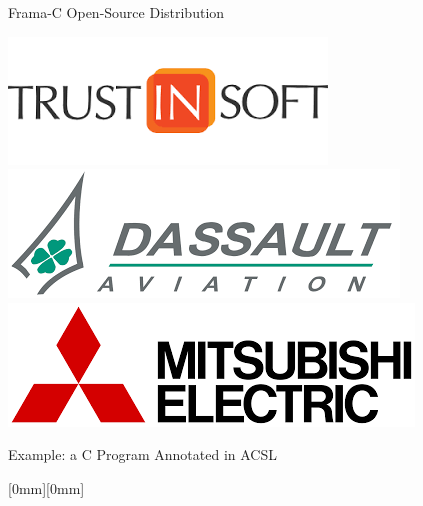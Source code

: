 \begin{frame}[fragile]{Frama-C Open-Source Distribution}
\begin{center}
    \hfill
    \includegraphics[scale=0.12]{logos/trustinsoft.png}
    \hfill
    \includegraphics[scale=0.12]{logos/dassault.png}
    \hfill
    \includegraphics[scale=0.12]{logos/mitsu.png}
    \hfill
  \end{center}

\end{frame}


\begin{frame}[label=exProven,fragile]{Example: a C Program Annotated in ACSL}

\raisebox{0mm}[0mm][0mm]{
}
\end{frame}


